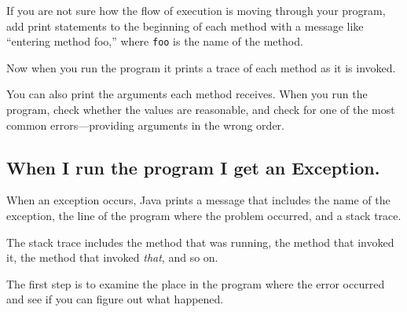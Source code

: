 \documentclass[12pt]{book}
\theoremstyle{definition}
\begin{document}
If you are not sure how the flow of execution is moving through
your program, add print statements to the beginning of each
method with a message like ``entering method foo,'' where
{\tt foo} is the name of the method.

Now when you run the program it prints a trace of each
method as it is invoked.

You can also print the arguments each method receives.  When you run
the program, check whether the values are reasonable, and check
for one of the most common errors---providing arguments in the wrong
order.


\subsection*{When I run the program I get an Exception.}

When an exception occurs, Java prints
a message that includes the name of the
exception, the line of the program where the problem occurred, and a
stack trace.

The stack trace includes the method that was running,
the method that invoked it, the method that
invoked {\em that}, and so on.

The first step is to examine the place in the program where
the error occurred and see if you can figure out what happened.
\end{document}
